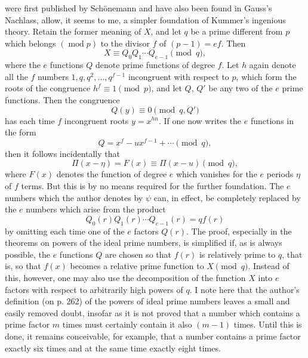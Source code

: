 \documentclass[11pt]{article}
\newcommand{\origpage}[1]{\par\vspace{0.25em}\noindent{\footnotesize\itshape [Printed page #1]}\par\vspace{0.25em}}
\begin{document}
\origpage{418}
were first published by Schönemann and have also been found in Gauss's Nachlass, allow, it seems to me, a simpler foundation of Kummer's ingenious theory. Retain the former meaning of $X$, and let $q$ be a prime different from $p$ which belongs $(\operatorname{mod} p)$ to the divisor $f$ of $(p-1)=ef$. Then
\[
 X\equiv Q_0Q_1\cdots Q_{e-1}\pmod q,
\]
where the $e$ functions $Q$ denote prime functions of degree $f$. Let $h$ again denote all the $f$ numbers $1,q,q^2,\ldots,q^{f-1}$ incongruent with respect to $p$, which form the roots of the congruence $h^f\equiv1\pmod p$, and let $Q$, $Q'$ be any two of the $e$ prime functions. Then the congruence
\[
 Q(y)\equiv0\pmod {q,Q'}
\]
has each time $f$ incongruent roots $y=x^{hn}$. If one now writes the $e$ functions in the form
\[
 Q=x^f-ux^{f-1}+\cdots \pmod q,
\]
then it follows incidentally that
\[
 \Pi(x-\eta)=F(x)\equiv\Pi(x-u)\pmod q,
\]
where $F(x)$ denotes the function of degree $e$ which vanishes for the $e$ periods $\eta$ of $f$ terms. But this is by no means required for the further foundation. The $e$ numbers which the author denotes by $\psi$ can, in effect, be completely replaced by the $e$ numbers which arise from the product
\[
 Q_0(r)Q_1(r)\cdots Q_{e-1}(r)=qf(r)
\]
by omitting each time one of the $e$ factors $Q(r)$. The proof, especially in the theorems on powers of the ideal prime numbers, is simplified if, as is always possible, the $e$ functions $Q$ are chosen so that $f(r)$ is relatively prime to $q$, that is, so that $f(x)$ becomes a relative prime function to $X\pmod q$. Instead of this, however, one may also use the decomposition of the function $X$ into $e$ factors with respect to arbitrarily high powers of $q$. I note here that the author's definition (on p. 262) of the powers of ideal prime numbers leaves a small and easily removed doubt, insofar as it is not proved that a number which contains a prime factor $m$ times must certainly contain it also $(m-1)$ times. Until this is done, it remains conceivable, for example, that a number contains a prime factor exactly six times and at the same time exactly eight times.
\end{document}
